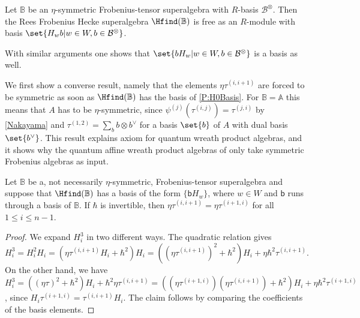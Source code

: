 \documentclass[a4paper,11pt]{amsart}
\newcommand\cB{\mathcal{B}}
\newcommand\cBo{\cB^{\otimes}}
\numberwithin{equation}{subsection}
\theoremstyle{definition}
\theoremstyle{theorem}
\theoremstyle{remark}
\newcommand\Sym{W}
\newcommand\bb{\mathsf{b}}
\newcommand{\Ao}{\mathbb{A}}
\newcommand{\Bo}{\mathbb{B}}
\begin{document}
\begin{Proposition}\label{P:H0Basis}
   Let $\Bo$ be an $\eta$-symmetric Frobenius-tensor superalgebra
   with $R$-basis $\cBo$. Then
   the Rees Frobenius Hecke superalgebra $\Hfind(\Bo)$
   is free as an $R$-module with basis $\set{H_wb| w\in W, b\in\cBo}$.
 \end{Proposition}
\begin{Remark}With similar arguments one shows that $\set{bH_w| w\in W, b\in\cBo}$ is a basis as well.
\end{Remark}
We first show a converse result, namely that the elements $\eta\tau^{(i,i+1)}$ are forced to be symmetric as soon
as $\Hfind(\Bo)$ has the basis of \autoref{P:H0Basis}. For $\Bo=\Ao$ this means that $A$ has to be
$\eta$-symmetric, since $\psi^{(j)}(\tau^{(i,j)})=\tau^{(j,i)}$ by \autoref{Nakayama} and
$\tau^{(1,2)}=\sum_bb\otimes b^\vee$ for a basis $\set{b}$ of $A$ with dual basis $\set{b^\vee}$.
This result explains axiom \cite[(3.2.3)]{CJNakanoXiang} for quantum wreath product algebras,
and it shows why the quantum affine wreath product algebras of
\cite{RossoSavage:QuantumAffineWreath} only take symmetric Frobenius algebras as input.

\begin{Lemma}\label{L:symmetric}
 Let $\Bo$ be a, not necessarily $\eta$-symmetric, Frobenius-tensor
  superalgebra and suppose that $\Hfind(\Bo)$ has a basis of the form
  $\{\bb H_w\}$, where $w\in\Sym$ and $\bb$ runs through a basis of
  $\Bo$. If $\hbar$ is invertible,  then $\eta\tau^{(i,i+1)}= \eta\tau^{(i+1,i)}$ for all $1\leq i
  \leq  n-1$.
\end{Lemma}

\begin{proof}
We expand $H_i^3$ in two different ways.  The quadratic relation  gives
\[H_i^3=H_i^2H_i=(\eta\tau^{(i,i+1)}
H_i+\hbar^2)H_i=((\eta\tau^{(i,i+1)})^2+\hbar^2)H_i+\eta\hbar^2\tau^{(i,i+1)}.\]
On the other hand, we have
$H_i^3=((\eta\tau)^2+\hbar^2)H_i+\hbar^2\eta\tau^{(i,i+1)}=((\eta\tau^{(i+1,i)})(\eta\tau^{(i,i+1)})
+\hbar^2)H_i+\eta\hbar^2\tau^{(i+1,i)}$, since $H_i\tau^{(i+1,i)}=\tau^{(i,i+1)}H_i$. The claim follows by comparing
the coefficients of the basis elements.
\end{proof}
\end{document}

